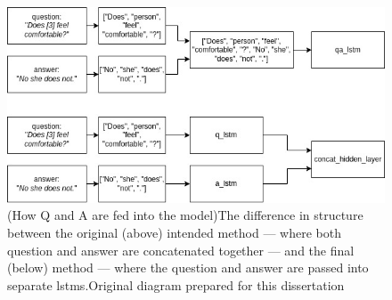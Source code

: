 \begin{figure}[htbp]
    \label{fig:lstm_implementation}
    \centering
    \includegraphics[width=.55\textwidth,keepaspectratio]{content/chapters/methodology/model_adaptation/figures/concat lstms vs q and a lstms.jpg}
    \captionsource(How Q and A are fed into the model){The difference in structure between the original (above) intended method --- where both question and answer are concatenated together --- and the final (below) method --- where the question and answer are passed into separate \glspl{lstm}.}{Original diagram prepared for this dissertation}
\end{figure}


